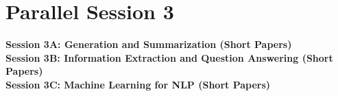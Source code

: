 \newpage
\section*{Parallel Session 3}
{\bfseries\large Session 3A: Generation and Summarization (Short Papers)}\\
\TrackALoc\hfill\sessionchair{}{}
\clearpage
{\bfseries\large Session 3B: Information Extraction and Question Answering (Short Papers)}\\
\TrackBLoc\hfill\sessionchair{}{}
\clearpage
{\bfseries\large Session 3C: Machine Learning for NLP (Short Papers)}\\
\TrackCLoc\hfill\sessionchair{}{}
\clearpage


